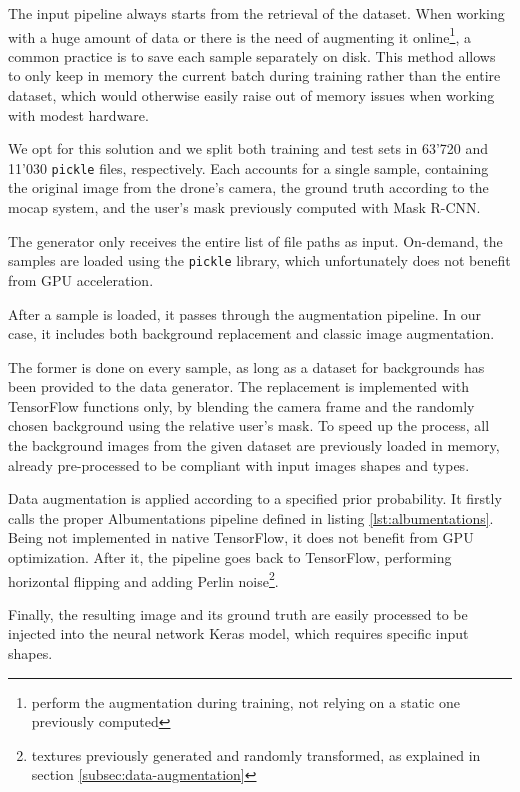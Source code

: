 The input pipeline always starts from the retrieval of the dataset. When working with a huge amount of data or there is the need of augmenting it online\footnote{perform the augmentation during training, not relying on a static one previously computed}, a common practice is to save each sample separately on disk. This method allows to only keep in memory the current batch during training rather than the entire dataset, which would otherwise easily raise out of memory issues when working with modest hardware.

We opt for this solution and we split both training and test sets in 63'720 and 11'030 \texttt{pickle} files, respectively. Each accounts for a single sample, containing the original image from the drone's camera, the ground truth according to the \gls{mocap} system, and the user's mask previously computed with Mask R-CNN.

The generator only receives the entire list of file paths as input. On-demand, the samples are loaded using the \texttt{pickle} library, which unfortunately does not benefit from GPU acceleration. 

\medskip

After a sample is loaded, it passes through the augmentation pipeline. In our case, it includes both background replacement and classic image augmentation. 

The former is done on every sample, as long as a dataset for backgrounds has been provided to the data generator. The replacement is implemented with TensorFlow functions only, by blending the camera frame and the randomly chosen background using the relative user's mask. To speed up the process, all the background images from the given dataset are previously loaded in memory, already pre-processed to be compliant with input images shapes and types.

Data augmentation is applied according to a specified prior probability. It firstly calls the proper Albumentations pipeline defined in listing \ref{lst:albumentations}. Being not implemented in native TensorFlow, it does not benefit from GPU optimization. After it, the pipeline goes back to TensorFlow, performing horizontal flipping and adding Perlin noise\footnote{textures previously generated and randomly transformed, as explained in section \ref{subsec:data-augmentation}}. 

\medskip

Finally, the resulting image and its ground truth are easily processed to be injected into the neural network Keras model, which requires specific input shapes.


